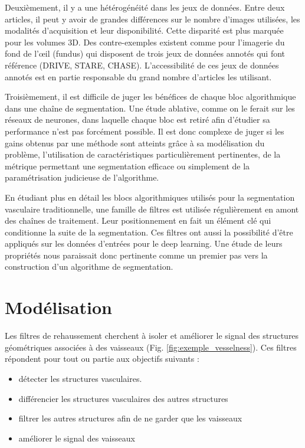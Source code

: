     Deuxièmement, il y a une hétérogénéité dans les jeux de données. Entre deux articles, il peut y avoir de grandes différences sur le nombre d'images utilisées, les modalités d'acquisition et leur disponibilité. Cette disparité est plus marquée pour les volumes 3D. Des contre-exemples existent comme pour l'imagerie du fond de l'œil (fundus) qui disposent de trois jeux de données annotés qui font référence (DRIVE, STARE, CHASE). L'accessibilité de ces jeux de données annotés est en partie responsable du grand nombre d'articles les utilisant.

    Troisièmement, il est difficile de juger les bénéfices de chaque bloc algorithmique dans une chaîne de segmentation. Une étude ablative, comme on le ferait sur les réseaux de neurones, dans laquelle chaque bloc est retiré afin d'étudier sa performance n'est pas forcément possible. Il est donc complexe de juger si les gains obtenus par une méthode sont atteints grâce à sa modélisation du problème, l'utilisation de caractéristiques particulièrement pertinentes, de la métrique permettant une segmentation efficace ou simplement de la paramétrisation judicieuse de l'algorithme.

    En étudiant plus en détail les blocs algorithmiques utilisés pour la segmentation vasculaire traditionnelle, une famille de filtres est utilisée régulièrement en amont des chaînes de traitement. Leur positionnement en fait un élément clé qui conditionne la suite de la segmentation. Ces filtres ont aussi la possibilité d'être appliqués sur les données d'entrées pour le deep learning. Une étude de leurs propriétés nous paraissait donc pertinente comme un premier pas vers la construction d'un algorithme de segmentation.


  \section{Modélisation}

  Les filtres de rehaussement cherchent à isoler et améliorer le signal des structures géométriques associées à des vaisseaux (Fig. \ref{fig:exemple_vesselness}). Ces filtres répondent pour tout ou partie aux objectifs suivants :

  \begin{itemize}
  \item détecter les structures vasculaires.
  \item différencier les structures vasculaires des autres structures
  \item filtrer les autres structures afin de ne garder que les vaisseaux
  \item améliorer le signal des vaisseaux
  \end{itemize}

